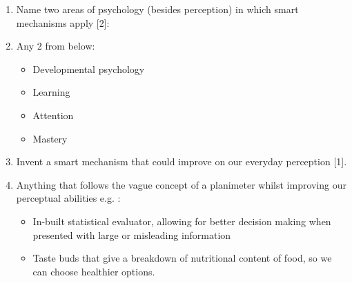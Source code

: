 \documentclass[12pt,english]{scrartcl}
\begin{document}
\begin{enumerate}
 \color{black}
 \item Name two areas of psychology (besides perception) in which smart mechanisms apply [2]:
 \item[]
 \color{blue}
 Any 2 from below:
 \begin{itemize}
  \item Developmental psychology
  \item Learning
  \item Attention
  \item Mastery
 \end{itemize}

 \color{black}
 \item Invent a smart mechanism that could improve on our everyday perception [1].
 \item[]
 \color{blue}
 Anything that follows the vague concept of a planimeter whilst improving our perceptual abilities e.g. : 
  \begin{itemize}
   \item In-built statistical evaluator, allowing for better decision making when presented with large or misleading information
   \item Taste buds that give a breakdown of nutritional content of food, so we can choose healthier options. 
  \end{itemize}

\end{enumerate}
\end{document}
